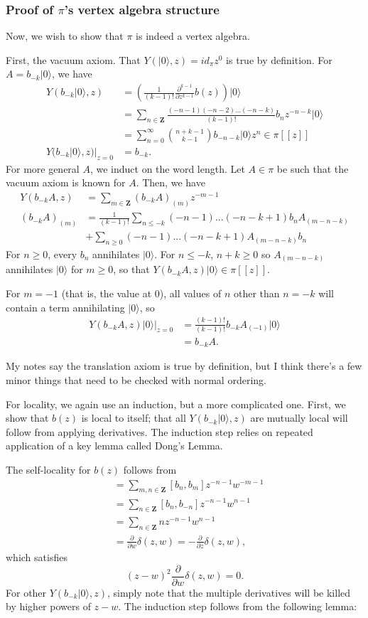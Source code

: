 \documentclass{article}
\newcommand{\ZZ}{\mathbold{Z}}
\newcommand{\vac}{|0\rangle}
\begin{document}
\subsubsection{Proof of $\pi$'s vertex algebra structure}
Now, we wish to show that $\pi$ is indeed a vertex algebra.

First, the vacuum axiom.  That $Y(\vac,z)=id_\pi z^0$ is true by definition.  For $A=b_{-k}\vac$, we have
\begin{align}
  Y(b_{-k}\vac,z)&=\left(\frac{1}{(k-1)!} \frac{\partial^{k-1}}{\partial z^{k-1}} b(z) \right) \vac\\
  &=\sum_{n \in \ZZ}\frac{(-n-1)(-n-2)...(-n-k)}{(k-1)!} b_n z^{-n-k} \vac\\
  &=\sum_{n=0}^\infty \binom{n+k-1}{k-1}b_{-n-k}\vac z^n \in \pi[[z]]\\
  Y(b_{-k}\vac,z)|_{z=0}&=b_{-k}.
\end{align}
For more general $A$, we induct on the word length.  Let $A \in \pi$ be such that the vacuum axiom is known for $A$.  Then, we have
\begin{align}
  Y(b_{-k}A,z)&= \sum_{m \in \ZZ}(b_{-k}A)_{(m)}z^{-m-1}\\
  (b_{-k}A)_{(m)}&=\frac{1}{(k-1)!}\sum_{n \le -k}(-n-1)...(-n-k+1)b_nA_{(m-n-k)}\\
  &+\sum_{n \ge 0}(-n-1)...(-n-k+1)A_{(m-n-k)}b_n
\end{align}
For $n \ge 0$, every $b_n$ annihilates $\vac$.  For $n \le -k$, $n+k \ge 0$ so $A_{(m-n-k)}$ annihilates $\vac$ for $m \ge 0$, so that $Y(b_{-k}A,z)\vac \in \pi[[z]]$.

For $m=-1$ (that is, the value at $0$), all values of $n$ other than $n=-k$ will contain a term annihilating $\vac$, so
\begin{align}
  Y(b_{-k}A,z)\vac|_{z=0}&=\frac{(k-1)!}{(k-1)!}b_{-k}A_{(-1)}\vac\\
  &=b_{-k}A.
\end{align}

My notes say the translation axiom is true by definition, but I think there's a few minor things that need to be checked with normal ordering.

For locality, we again use an induction, but a more complicated one.  First, we show that $b(z)$ is local to itself; that all $Y(b_{-k}\vac,z)$ are mutually local will follow from applying derivatives.  The induction step relies on repeated application of a key lemma called Dong's Lemma.

The self-locality for $b(z)$ follows from
\begin{align}
  [b(z),b(w)]&=\sum_{m,n \in \ZZ}[b_n,b_m]z^{-n-1}w^{-m-1}\\
  &=\sum_{n \in \ZZ}[b_n,b_{-n}]z^{-n-1}w^{n-1}\\
  &=\sum_{n \in \ZZ}nz^{-n-1}w^{n-1}\\
  &=\frac{\partial}{\partial w}\delta(z,w)=-\frac{\partial}{\partial z}\delta(z,w),
\end{align}
which satisfies
\[(z-w)^2 \frac{\partial}{\partial w}\delta(z,w)=0.\]  
For other $Y(b_{-k}\vac,z)$, simply note that the multiple derivatives will be killed by higher powers of $z-w$.  The induction step follows from the following lemma:
\end{document}
